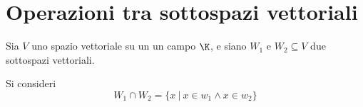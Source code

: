 \section{Operazioni tra sottospazi vettoriali}

Sia $V$ uno spazio vettoriale su un un campo $\K$, e siano $W_1$ e $W_2\subseteq V$ due sottospazi vettoriali.

Si consideri
\[
W_1 \cap W_2 = \{x\:|\: x\in w_1 \land x \in w_2\}
\]


